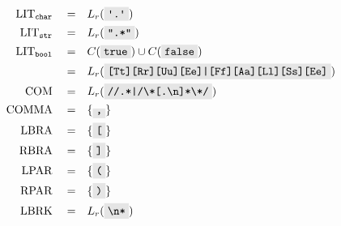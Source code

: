 \documentclass{article}
\newcommand{\code}[1]{\colorbox{gray!20}{\texttt{#1}}}
\begin{document}
\begin{multicols}{2}
\begin{align}
    \mathrm{LIT}_{\mathtt{char}}\quad =&\quad L_r( \code{\textquotesingle.\textquotesingle}) \\
    \mathrm{LIT}_{\mathtt{str}}\quad =&\quad L_r( \code{".*"}) \\
    \mathrm{LIT}_{\mathtt{bool}} \quad =&\quad C(\code{true}) \cup C(\code{false})  \\
    =& \quad L_r(\code{[Tt][Rr][Uu][Ee]|[Ff][Aa][Ll][Ss][Ee]}) \nonumber \\
    \mathrm{COM} \quad =&\quad L_r(\code{//.*|/\textbackslash*[.\textbackslash n]*\textbackslash*/})\\
    \mathrm{COMMA} \quad =&\quad \{\code,\} \\
    \mathrm{LBRA} \quad =&\quad \{\code[\} \\
    \mathrm{RBRA} \quad =&\quad \{\code]\} \\
    \mathrm{LPAR} \quad =&\quad \{\code(\} \\
    \mathrm{RPAR} \quad =&\quad \{\code)\} \\
    \mathrm{LBRK} \quad =&\quad L_r(\code{\textbackslash n*}) \\
\end{align}
\end{multicols}
\end{document}
